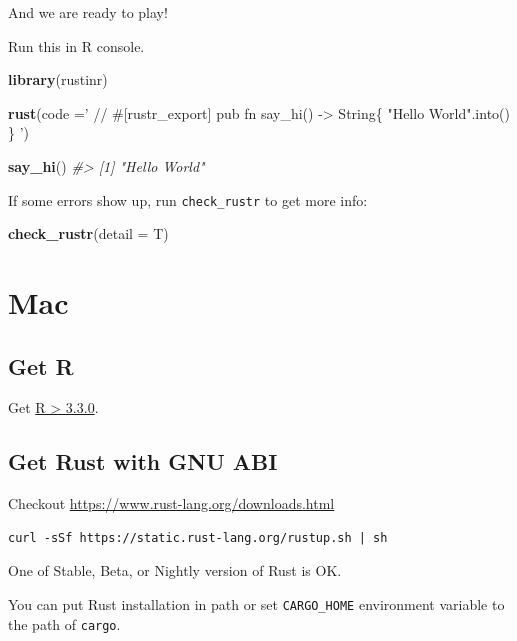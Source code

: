 \documentclass[]{book}
\newenvironment{Shaded}{\begin{snugshade}}{\end{snugshade}}
\newcommand{\KeywordTok}[1]{\textcolor[rgb]{0.13,0.29,0.53}{\textbf{{#1}}}}
\newcommand{\DataTypeTok}[1]{\textcolor[rgb]{0.13,0.29,0.53}{{#1}}}
\newcommand{\StringTok}[1]{\textcolor[rgb]{0.31,0.60,0.02}{{#1}}}
\newcommand{\CommentTok}[1]{\textcolor[rgb]{0.56,0.35,0.01}{\textit{{#1}}}}
\newcommand{\NormalTok}[1]{{#1}}
\begin{document}
And we are ready to play!

Run this in R console.

\begin{Shaded}
\begin{Highlighting}[]
\KeywordTok{library}\NormalTok{(rustinr)}

\KeywordTok{rust}\NormalTok{(}\DataTypeTok{code =}\StringTok{'}
\StringTok{// #[rustr_export]}
\StringTok{pub fn say_hi() -> String\{}
\StringTok{    "Hello World".into()}
\StringTok{\}}
\StringTok{'}\NormalTok{)}

\KeywordTok{say_hi}\NormalTok{()}
\CommentTok{#> [1] "Hello World"}
\end{Highlighting}
\end{Shaded}

If some errors show up, run \texttt{check\_rustr} to get more info:

\begin{Shaded}
\begin{Highlighting}[]
\KeywordTok{check_rustr}\NormalTok{(}\DataTypeTok{detail =} \NormalTok{T)}
\end{Highlighting}
\end{Shaded}

\section{Mac}\label{mac}

\subsection{Get R}\label{get-r-1}

Get \href{https://cran.r-project.org/bin/macosx/}{R \textgreater{}
3.3.0}.

\subsection{Get Rust with GNU ABI}\label{get-rust-with-gnu-abi-1}

Checkout \url{https://www.rust-lang.org/downloads.html}

\begin{verbatim}
curl -sSf https://static.rust-lang.org/rustup.sh | sh
\end{verbatim}

One of Stable, Beta, or Nightly version of Rust is OK.

You can put Rust installation in path or set \texttt{CARGO\_HOME}
environment variable to the path of \texttt{cargo}.
\end{document}
